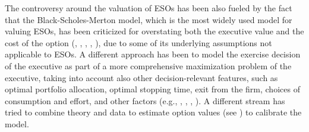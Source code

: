     The controversy around the valuation of ESOs has been also fueled by the fact that the Black-Scholes-Merton model, which is the most widely used model for valuing ESOs, has been criticized for overstating both the executive value and the cost of the option (\cite{carpenter1998exercise}, \cite{meulbroek2001efficiency}, \cite{hall2003trouble}, \cite{ingersoll2006subjective}, \cite{carpenter2010optimal} \cite{frydman2010ceo}), due to some of its underlying assumptions not applicable to ESOs. A different approach has been to model the exercise decision of the executive as part of a more comprehensive maximization problem of the executive, taking into account also other decision-relevant features, such as optimal portfolio allocation, optimal stopping time, exit from the firm, choices of consumption and effort, and other factors (e.g., \cite{huddart1996employee}, \cite{ingersoll2006subjective}, \cite{grasselli2009risk}, \cite{carpenter2010optimal}). A different stream has tried to combine theory and data to estimate option values (see \cite{carpenter1998exercise}) to calibrate the model.

